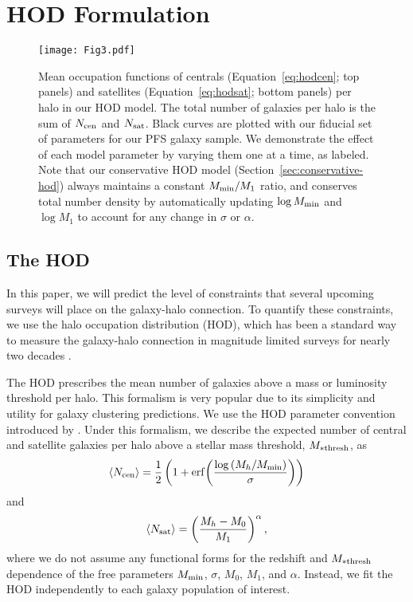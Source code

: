 \documentclass[twocolumn,twocolappendix]{aastex63}
\begin{document}
\section{HOD Formulation}
\label{sec:hod-formulation}

\begin{figure}[ht!]
\texttt{[image: Fig3.pdf]}
\caption{Mean occupation functions of centrals (Equation~\ref{eq:hodcen}; top panels) and satellites (Equation~\ref{eq:hodsat}; bottom panels) per halo in our HOD model. The total number of galaxies per halo is the sum of $N_{\rm cen}$ and $N_{\rm sat}$. Black curves are plotted with our fiducial set of parameters for our PFS galaxy sample. We demonstrate the effect of each model parameter by varying them one at a time, as labeled. Note that our conservative HOD model (Section~\ref{sec:conservative-hod}) always maintains a constant $M_{\rm min} / M_1$ ratio, and conserves total number density by automatically updating $\log M_{\rm min}$ and $\log M_1$ to account for any change in $\sigma$ or $\alpha$.
\label{fig:hod}}
\end{figure}

\subsection{The HOD}
\label{sec:hod}

In this paper, we will predict the level of constraints that several upcoming surveys will place on the galaxy-halo connection. To quantify these constraints, we use the halo occupation distribution (HOD), which has been a standard way to measure the galaxy-halo connection in magnitude limited surveys for nearly two decades \citep{Berlind:Weinberg:2002}.

The HOD prescribes the mean number of galaxies above a mass or luminosity threshold per halo. This formalism is very popular due to its simplicity and utility for galaxy clustering predictions. We use the HOD parameter convention introduced by \citet{Zheng:2007}. Under this formalism, we describe the expected number of central and satellite galaxies per halo above a stellar mass threshold, $M_{\ast{\rm thresh}}$, as 
\begin{equation} \label{eq:hodcen}
    \langle N_{{\rm cen}} \rangle = \frac{1}{2}\left(1 + {\rm erf}{\left(\frac{\log\left(M_h / M_{\rm min}\right)}{\sigma}\right)}\right)
\end{equation}
and
\begin{equation} \label{eq:hodsat}
    \langle N_{{\rm sat}} \rangle = \left(\frac{M_h - M_0}{M_1}\right)^\alpha,
\end{equation}
where we do not assume any functional forms for the redshift and $M_{\ast{\rm thresh}}$ dependence of the free parameters $M_{\rm min}$, $\sigma$, $M_0$, $M_1$, and $\alpha$. Instead, we fit the HOD independently to each galaxy population of interest.
\end{document}
